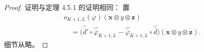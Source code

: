 \begin{proof}
证明与定理 4.5.1 的证明相同：
置
\[
\begin{aligned}
&o_{K+1,L}(\overline\varphi)
(\mathbf x\otimes y\otimes\mathbf z)\\
&\quad=
\bigl(
\widehat{\overline d}'\circ
\widehat{\overline\varphi}_{K+1,L}
-\widehat{\overline\varphi}_{K+1,L}
\circ\widehat{\overline d}
\bigr)
(\mathbf x\otimes y\otimes\mathbf z).
\end{aligned}
\]
细节从略。
\end{proof}
